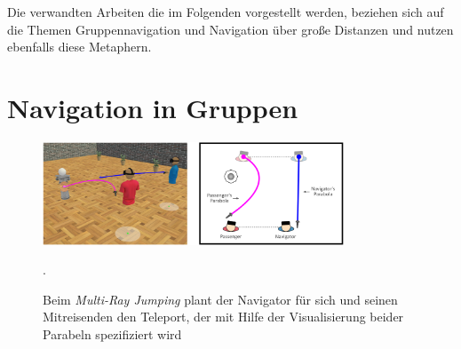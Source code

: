 Die verwandten Arbeiten die im Folgenden vorgestellt werden, beziehen sich auf die Themen Gruppennavigation und Navigation über große Distanzen und nutzen ebenfalls diese Metaphern.

\section{Navigation in Gruppen}
\begin{figure}[h]
  \centering
  \includegraphics[width=0.8\textwidth]{images/multiray.png}
  \caption{Beim \textit{Multi-Ray Jumping} plant der Navigator für sich und seinen Mitreisenden den Teleport, der mit Hilfe der Visualisierung beider Parabeln spezifiziert wird \cite{WeisskerMulti-RayReality}}.
  \label{fig:todo}
\end{figure}

